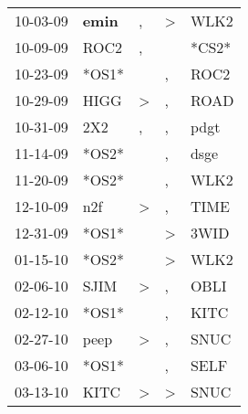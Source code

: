 \begin{supertabular}{p{0.07\textwidth}p{0.06\textwidth}p{0.02\textwidth}p{0.02\textwidth}p{0.06\textwidth}}
          10-03-09\textsuperscript{} &  \textbf{emin\textsuperscript{}} &                , &  \textgreater &           WLK2\textsuperscript{} \\
          10-09-09\textsuperscript{} &           ROC2\textsuperscript{} &                , &               &                            *CS2* \\
          10-23-09\textsuperscript{} &                            *OS1* &                  &             , &           ROC2\textsuperscript{} \\
          10-29-09\textsuperscript{} &           HIGG\textsuperscript{} &     \textgreater &             , &           ROAD\textsuperscript{} \\
          10-31-09\textsuperscript{} &            2X2\textsuperscript{} &                , &             , &           pdgt\textsuperscript{} \\
          11-14-09\textsuperscript{} &                            *OS2* &                  &             , &           dsge\textsuperscript{} \\
          11-20-09\textsuperscript{} &                            *OS2* &                  &             , &           WLK2\textsuperscript{} \\
          12-10-09\textsuperscript{} &            n2f\textsuperscript{} &     \textgreater &             , &           TIME\textsuperscript{} \\
          12-31-09\textsuperscript{} &                            *OS1* &                  &  \textgreater &           3WID\textsuperscript{} \\
          01-15-10\textsuperscript{} &                            *OS2* &                  &  \textgreater &           WLK2\textsuperscript{} \\
          02-06-10\textsuperscript{} &           SJIM\textsuperscript{} &     \textgreater &             , &           OBLI\textsuperscript{} \\
          02-12-10\textsuperscript{} &                            *OS1* &                  &             , &           KITC\textsuperscript{} \\
          02-27-10\textsuperscript{} &           peep\textsuperscript{} &     \textgreater &             , &           SNUC\textsuperscript{} \\
          03-06-10\textsuperscript{} &                            *OS1* &                  &             , &           SELF\textsuperscript{} \\
          03-13-10\textsuperscript{} &           KITC\textsuperscript{} &     \textgreater &  \textgreater &           SNUC\textsuperscript{} \\

\end{supertabular}
